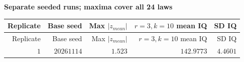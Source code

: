 
\begingroup\small
\setlength{\tabcolsep}{4pt}
\noindent\textbf{Separate seeded runs; maxima cover all 24 laws}
\begin{longtable}{rrrrr}
\toprule
Replicate & Base seed & Max $|z_{mean}|$ & $r=3,k=10$ mean IQ & SD IQ \\
\midrule
\endfirsthead
Replicate & Base seed & Max $|z_{mean}|$ & $r=3,k=10$ mean IQ & SD IQ \\
\midrule
\endhead
\bottomrule
\endfoot
$1$ & $20261114$ & $1.523$ & $142.9773$ & $4.4601$ \\
\end{longtable}
\endgroup
